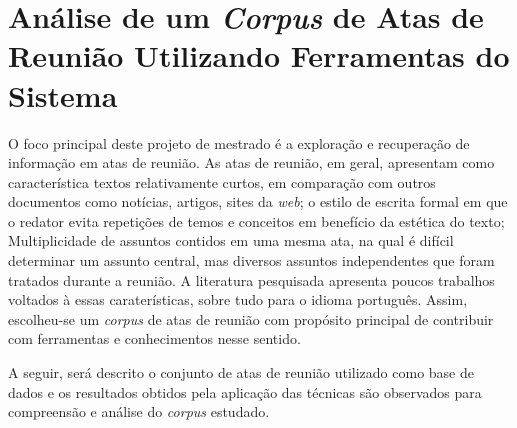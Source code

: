 



\section{Análise de um \textit{Corpus} de Atas de Reunião Utilizando Ferramentas do Sistema}	
\label{sec:aplicacao-sistema}

O foco principal deste projeto de mestrado é a exploração e recuperação de informação em atas de reunião. 
% 
As atas de reunião, em geral, apresentam como característica textos relativamente curtos, em comparação com outros documentos como notícias, artigos, sites da \textit{web}; o estilo de escrita formal em que o redator evita repetições de temos e conceitos em benefício da estética do texto; Multiplicidade de assuntos contidos em uma mesma ata, na qual é difícil determinar um assunto central, mas diversos assuntos independentes que foram tratados durante a reunião.
A literatura pesquisada apresenta poucos trabalhos voltados à essas caraterísticas, sobre tudo para o idioma português. Assim, escolheu-se um \textit{corpus} de atas de reunião com propósito principal de contribuir com ferramentas e conhecimentos nesse sentido. 



A seguir, será descrito o conjunto de atas de reunião utilizado como base de dados e os resultados obtidos pela aplicação das técnicas são observados para compreensão e análise do \textit{corpus} estudado.




